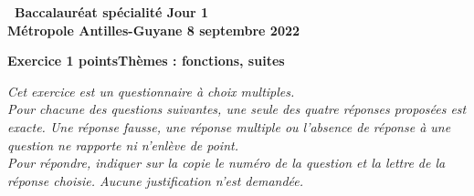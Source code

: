 \documentclass[10pt,a4paper]{article}
\begin{document}
\label{Metropole3}

\pagestyle{fancy}
\thispagestyle{empty}
\begin{center} {\Large \textbf{\decofourleft~Baccalauréat spécialité Jour 1 \decofourright\\[7pt]
Métropole Antilles-Guyane 8  septembre 2022}}
\end{center}

\bigskip

\textbf{Exercice 1   points\hfill Thèmes : fonctions, suites}

\medskip

\emph{Cet exercice est un questionnaire à choix multiples.\\
Pour chacune des questions suivantes, une seule des quatre réponses proposées est exacte. Une réponse fausse, une réponse multiple ou l'absence de réponse à une question ne rapporte ni n'enlève de point.\\
Pour répondre, indiquer sur la copie le numéro de la question et la lettre de la réponse choisie. Aucune justification n'est demandée.}

\medskip
\end{document}
